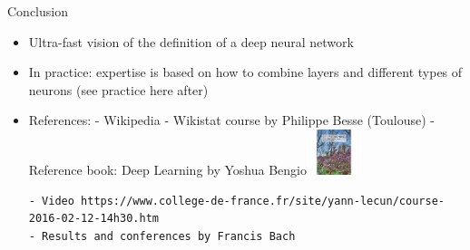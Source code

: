 \documentclass[ignorenonframetext,]{beamer}
\begin{document}
\begin{frame}[fragile]{Conclusion}
\protect\hypertarget{conclusion-1}{}

\begin{itemize}
\item
  Ultra-fast vision of the definition of a deep neural network
\item
  In practice: expertise is based on how to combine layers and different
  types of neurons (see practice here after)
\item
  References: - Wikipedia - Wikistat course by Philippe Besse (Toulouse)
  - Reference book: Deep Learning by Yoshua Bengio
  \includegraphics[width=0.52083in,height=\textheight]{livre_bengio.jpg}

\begin{verbatim}
- Video https://www.college-de-france.fr/site/yann-lecun/course-2016-02-12-14h30.htm
- Results and conferences by Francis Bach
\end{verbatim}
\end{itemize}

\end{frame}
\end{document}
